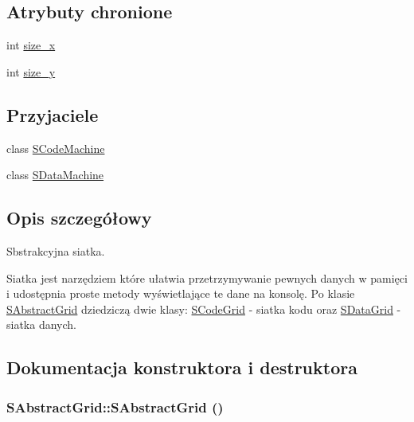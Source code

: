 \subsection*{Atrybuty chronione}
\begin{CompactItemize}
\item 
int \hyperlink{classSAbstractGrid_f0b1916fda47bbd921fc1b5b5abadb72}{size\_\-x}
\item 
int \hyperlink{classSAbstractGrid_b9fddbe2004e7242dff69aa20da8a3c3}{size\_\-y}
\end{CompactItemize}
\subsection*{Przyjaciele}
\begin{CompactItemize}
\item 
\hypertarget{classSAbstractGrid_13f503f5e1b3625e973ac350880b3a31}{
class \hyperlink{classSAbstractGrid_13f503f5e1b3625e973ac350880b3a31}{SCodeMachine}}
\label{classSAbstractGrid_13f503f5e1b3625e973ac350880b3a31}

\item 
\hypertarget{classSAbstractGrid_b064517f75c184bae39efba1df818a12}{
class \hyperlink{classSAbstractGrid_b064517f75c184bae39efba1df818a12}{SDataMachine}}
\label{classSAbstractGrid_b064517f75c184bae39efba1df818a12}

\end{CompactItemize}


\subsection{Opis szczegółowy}
Sbstrakcyjna siatka. 

Siatka jest narzędziem które ułatwia przetrzymywanie pewnych danych w pamięci i udostępnia proste metody wyświetlające te dane na konsolę. Po klasie \hyperlink{classSAbstractGrid}{SAbstractGrid} dziedziczą dwie klasy: \hyperlink{classSCodeGrid}{SCodeGrid} - siatka kodu oraz \hyperlink{classSDataGrid}{SDataGrid} - siatka danych. 

\subsection{Dokumentacja konstruktora i destruktora}
\hypertarget{classSAbstractGrid_2df5b6a5bd2a11d9015104f3dd6afc20}{
\subsubsection[{SAbstractGrid}]{\setlength{\rightskip}{0pt plus 5cm}SAbstractGrid::SAbstractGrid ()}}
\label{classSAbstractGrid_2df5b6a5bd2a11d9015104f3dd6afc20}


